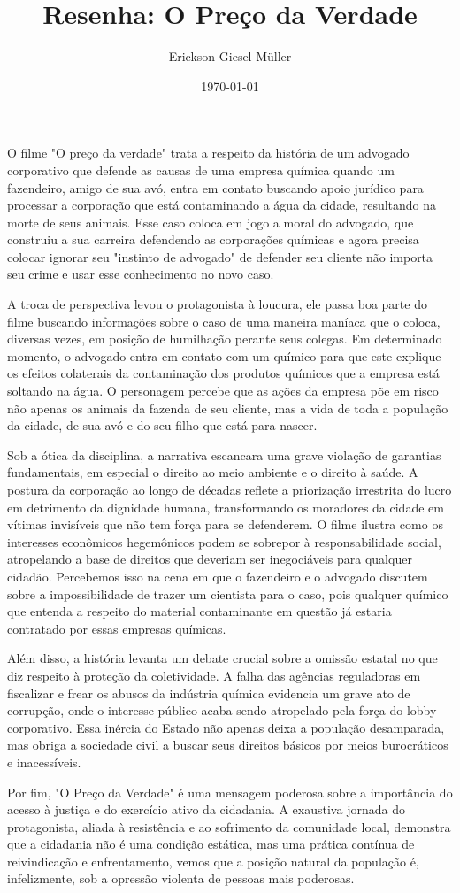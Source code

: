 \documentclass[12pt, a4paper]{article}
\title{Resenha: O Preço da Verdade}
\author{Erickson Giesel Müller}
\date{\today}
\begin{document}
\maketitle
\thispagestyle{empty} %

	O filme "O preço da verdade" trata a respeito da história de um advogado corporativo que defende as causas de uma empresa química quando um fazendeiro, amigo de sua avó, entra em contato buscando apoio jurídico para processar a corporação que está contaminando a água da cidade, resultando na morte de seus animais. Esse caso coloca em jogo a moral do advogado, que construiu a sua carreira defendendo as corporações químicas e agora precisa colocar ignorar seu "instinto de advogado" de defender seu cliente não importa seu crime e usar esse conhecimento no novo caso.

	A troca de perspectiva levou o protagonista à loucura, ele passa boa parte do filme buscando informações sobre o caso de uma maneira maníaca que o coloca, diversas vezes, em posição de humilhação perante seus colegas. Em determinado momento, o advogado entra em contato com um químico para que este explique os efeitos colaterais da contaminação dos produtos químicos que a empresa está soltando na água. O personagem percebe que as ações da empresa põe em risco não apenas os animais da fazenda de seu cliente, mas a vida de toda a população da cidade, de sua avó e do seu filho que está para nascer.

	Sob a ótica da disciplina, a narrativa escancara uma grave violação de garantias fundamentais, em especial o direito ao meio ambiente e o direito à saúde. A postura da corporação ao longo de décadas reflete a priorização irrestrita do lucro em detrimento da dignidade humana, transformando os moradores da cidade em vítimas invisíveis que não tem força para se defenderem. O filme ilustra como os interesses econômicos hegemônicos podem se sobrepor à responsabilidade social, atropelando a base de direitos que deveriam ser inegociáveis para qualquer cidadão. Percebemos isso na cena em que o fazendeiro e o advogado discutem sobre a impossibilidade de trazer um cientista para o caso, pois qualquer químico que entenda a respeito do material contaminante em questão já estaria contratado por essas empresas químicas.

Além disso, a história levanta um debate crucial sobre a omissão estatal no que diz respeito à proteção da coletividade. A falha das agências reguladoras em fiscalizar e frear os abusos da indústria química evidencia um grave ato de corrupção, onde o interesse público acaba sendo atropelado pela força do lobby corporativo. Essa inércia do Estado não apenas deixa a população desamparada, mas obriga a sociedade civil a buscar seus direitos básicos por meios burocráticos e inacessíveis.

Por fim, "O Preço da Verdade" é uma mensagem poderosa sobre a importância do acesso à justiça e do exercício ativo da cidadania. A exaustiva jornada do protagonista, aliada à resistência e ao sofrimento da comunidade local, demonstra que a cidadania não é uma condição estática, mas uma prática contínua de reivindicação e enfrentamento, vemos que a posição natural da população é, infelizmente, sob a opressão violenta de pessoas mais poderosas.
\end{document}
